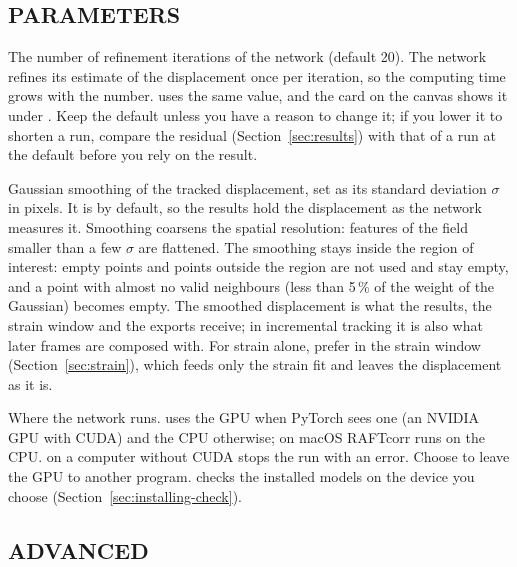 \subsection{PARAMETERS}

\begin{description}[leftmargin=1.2cm,style=nextline]
  \item[Iterations]
    The number of refinement iterations of the network (default 20). The network refines its
    estimate of the displacement once per iteration, so the computing time grows with the
    number.  uses the same value, and the card on the canvas shows it under
    . Keep the default unless you have a reason to change it; if you lower it to
    shorten a run, compare the residual (Section~\ref{sec:results}) with that of a run at the
    default before you rely on the result.
  \item[Smoothing]
    Gaussian smoothing of the tracked displacement, set as its standard deviation $\sigma$ in
    pixels. It is  by default, so the results hold the displacement as the network
    measures it. Smoothing coarsens the spatial resolution: features of the field smaller than
    a few $\sigma$ are flattened. The smoothing stays inside the region of interest: empty points
    and points outside the region are not used and stay empty, and a point with almost no valid
    neighbours (less than 5\,\% of the weight of the Gaussian) becomes empty. The smoothed
    displacement is what the results, the strain window and the exports receive; in
    incremental tracking it is also what later frames are composed with. For strain alone,
    prefer  in the strain window (Section~\ref{sec:strain}), which feeds
    only the strain fit and leaves the displacement as it is.
  \item[Device]
    Where the network runs.  uses the GPU when PyTorch sees one (an NVIDIA GPU
    with CUDA) and the CPU otherwise; on macOS RAFTcorr runs on the CPU.  on a
    computer without CUDA stops the run with an error. Choose  to leave the GPU to
    another program.  checks the installed models on the device you choose
    (Section~\ref{sec:installing-check}).
\end{description}

\subsection{ADVANCED}

